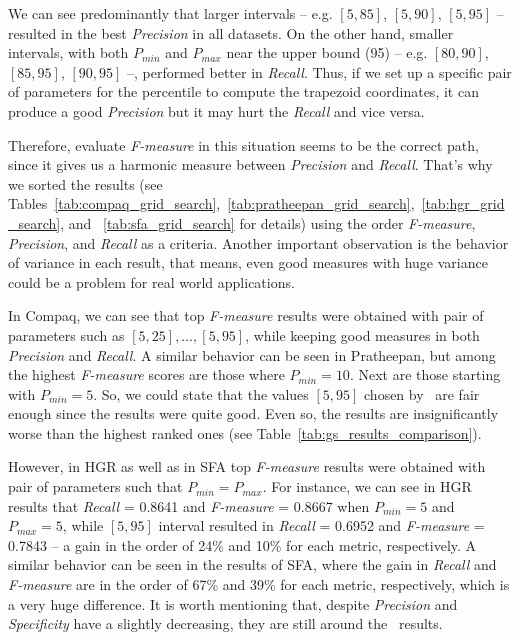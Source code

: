 We can see predominantly that larger intervals -- e.g. $[5, 85]$, $[5, 90]$, $[5, 95]$ -- resulted in the best \emph{Precision} in all datasets. On the other hand, smaller intervals, with both $P_{min}$ and $P_{max}$ near the upper bound (95) -- e.g. $[80, 90]$, $[85, 95]$, $[90 ,95]$ --, performed better in \emph{Recall}. Thus, if we set up a specific pair of parameters for the percentile to compute the trapezoid coordinates, it can produce a good \emph{Precision} but it may hurt the \emph{Recall} and vice versa.

Therefore, evaluate \emph{F-measure} in this situation seems to be the correct path, since it gives us a harmonic measure between \emph{Precision} and \emph{Recall}. That's why we sorted the results (see Tables~\ref{tab:compaq_grid_search},~\ref{tab:pratheepan_grid_search},~\ref{tab:hgr_grid_search}, and ~\ref{tab:sfa_grid_search} for details) using the order \emph{F-measure}, \emph{Precision}, and \emph{Recall} as a criteria. Another important observation is the behavior of variance in each result, that means, even good measures with huge variance could be a problem for real world applications.

In Compaq, we can see that top \emph{F-measure} results were obtained with pair of parameters such as $[5, 25], \ldots, [5, 95]$, while keeping good measures in both \emph{Precision} and \emph{Recall}. A similar behavior can be seen in Pratheepan, but among the highest \emph{F-measure} scores are those where $P_{min} = 10$. Next are those starting with $P_{min} = 5$. So, we could state that the values $[5, 95]$ chosen by~\citet{brancati:17} are fair enough since the results were quite good. Even so, the results are insignificantly worse than the highest ranked ones (see Table~\ref{tab:gs_results_comparison}).

However, in HGR as well as in SFA top \emph{F-measure} results were obtained with pair of parameters such that $P_{min} = P_{max}$. For instance, we can see in HGR results that \emph{Recall} = 0.8641 and \emph{F-measure} = 0.8667 when $P_{min} = 5$ and $P_{max} = 5$, while $[5, 95]$ interval resulted in \emph{Recall} = 0.6952 and \emph{F-measure} = 0.7843 -- a gain in the order of 24\% and 10\% for each metric, respectively. A similar behavior can be seen in the results of SFA, where the gain in \emph{Recall} and \emph{F-measure} are in the order of 67\% and 39\% for each metric, respectively, which is a very huge difference. It is worth mentioning that, despite \emph{Precision} and \emph{Specificity} have a slightly decreasing, they are still around the~\citet{brancati:17} results.



